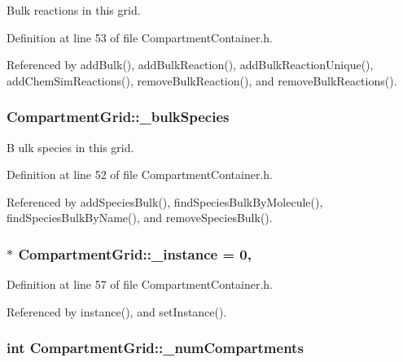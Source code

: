 Bulk reactions in this grid. 



Definition at line 53 of file Compartment\+Container.\+h.



Referenced by add\+Bulk(), add\+Bulk\+Reaction(), add\+Bulk\+Reaction\+Unique(), add\+Chem\+Sim\+Reactions(), remove\+Bulk\+Reaction(), and remove\+Bulk\+Reactions().

\hypertarget{classCompartmentGrid_ae514970414a3ffc396e734f67a08e961}{
\subsubsection[{\+\_\+bulk\+Species}]{ Compartment\+Grid\+::\+\_\+bulk\+Species\hspace{0.3cm}{\ttfamily [private]}}}\label{classCompartmentGrid_ae514970414a3ffc396e734f67a08e961}


B ulk species in this grid. 



Definition at line 52 of file Compartment\+Container.\+h.



Referenced by add\+Species\+Bulk(), find\+Species\+Bulk\+By\+Molecule(), find\+Species\+Bulk\+By\+Name(), and remove\+Species\+Bulk().

\hypertarget{classCompartmentGrid_ac0eb2be3df5e78d5fe6dbfb75b717866}{
\subsubsection[{\+\_\+instance}]{ $\ast$ Compartment\+Grid\+::\+\_\+instance = 0\hspace{0.3cm}{\ttfamily [static]}, {\ttfamily [private]}}}\label{classCompartmentGrid_ac0eb2be3df5e78d5fe6dbfb75b717866}


Definition at line 57 of file Compartment\+Container.\+h.



Referenced by instance(), and set\+Instance().

\hypertarget{classCompartmentGrid_a3f56638a21f59ed7877b0abbf0de1cde}{
\subsubsection[{\+\_\+num\+Compartments}]{\setlength{\rightskip}{0pt plus 5cm}int Compartment\+Grid\+::\+\_\+num\+Compartments\hspace{0.3cm}{\ttfamily [private]}}}\label{classCompartmentGrid_a3f56638a21f59ed7877b0abbf0de1cde}


